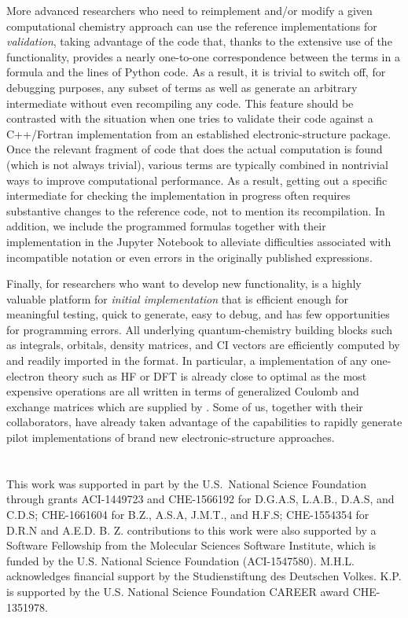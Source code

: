 More advanced researchers who need to reimplement and/or modify a given computational chemistry approach can use the \pfn reference implementations for \emph{validation}, taking advantage of the code that, thanks to the extensive use of the \numpy \einsum functionality, provides a nearly one-to-one correspondence between the terms in a formula and the lines of Python code. As a result, it is trivial to switch off, for debugging purposes, any subset of terms as well as generate an arbitrary intermediate without even recompiling any code.  This feature should be contrasted with the situation when one tries to validate their code against a C++/Fortran implementation from an established electronic-structure package. Once the relevant fragment of code that does the actual computation is found (which is not always trivial), various terms are typically combined in nontrivial ways to improve computational performance. As a result, getting out a specific intermediate for checking the implementation in progress often requires substantive changes to the reference code, not to mention its recompilation.  In addition, we include the programmed formulas together with their implementation in the Jupyter Notebook to alleviate difficulties associated with incompatible notation or even errors in the originally published expressions.

Finally, for researchers who want to develop new functionality, \pfn is a highly valuable platform for \emph{initial implementation} that is efficient enough for meaningful testing, quick to generate, easy to debug, and has few opportunities for programming errors. All underlying quantum-chemistry building blocks such as integrals, orbitals, density matrices, and CI vectors are efficiently computed by \pfour and readily imported in the \numpy format. In particular, a \pfn implementation of any one-electron theory such as HF or DFT is already close to optimal as the most expensive operations are all written in terms of generalized Coulomb and exchange matrices which are supplied by \pfour.  Some of us, together with their collaborators, have already taken advantage of the \pfn capabilities to rapidly generate pilot implementations of brand new electronic-structure approaches.

\section{\texorpdfstring{}{Acknowledgements}}

This work was supported in part by the U.S.~National Science Foundation through grants ACI-1449723 and CHE-1566192 for D.G.A.S, L.A.B., D.A.S, and C.D.S; CHE-1661604 for B.Z., A.S.A, J.M.T., and H.F.S; CHE-1554354 for D.R.N and A.E.D. B. Z. contributions to this work were also supported by a Software Fellowship from the Molecular Sciences Software Institute, which is funded by the U.S. National Science Foundation (ACI-1547580). M.H.L. acknowledges financial support by the Studienstiftung des Deutschen Volkes. K.P. is supported by the U.S. National Science Foundation CAREER award CHE-1351978.

